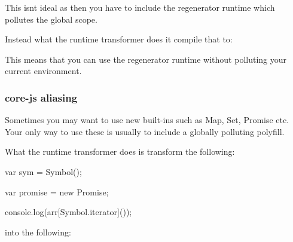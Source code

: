 This isn\textquotesingle{}t ideal as then you have to include the regenerator runtime which pollutes the global scope.

Instead what the {\ttfamily runtime} transformer does it compile that to\+:




This means that you can use the regenerator runtime without polluting your current environment.

\subsubsection*{{\ttfamily core-\/js} aliasing}

Sometimes you may want to use new built-\/ins such as {\ttfamily Map}, {\ttfamily Set}, {\ttfamily Promise} etc. Your only way to use these is usually to include a globally polluting polyfill.

What the {\ttfamily runtime} transformer does is transform the following\+:


\begin{DoxyCode}
var sym = Symbol();

var promise = new Promise;

console.log(arr[Symbol.iterator]());
\end{DoxyCode}


into the following\+:


